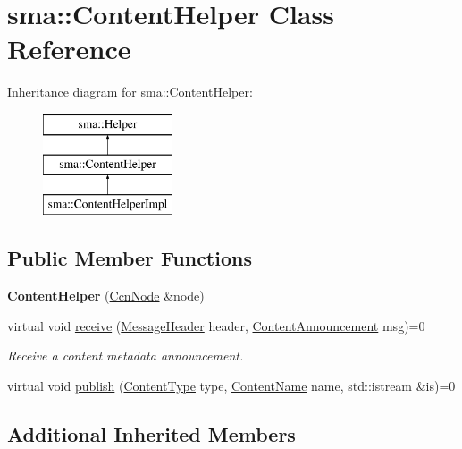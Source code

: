 \hypertarget{classsma_1_1ContentHelper}{\section{sma\-:\-:Content\-Helper Class Reference}
\label{classsma_1_1ContentHelper}
}
Inheritance diagram for sma\-:\-:Content\-Helper\-:\begin{figure}[H]
\begin{center}
\leavevmode
\includegraphics[height=3.000000cm]{classsma_1_1ContentHelper}
\end{center}
\end{figure}
\subsection*{Public Member Functions}
\begin{DoxyCompactItemize}
\item 
\hypertarget{classsma_1_1ContentHelper_a4885a081647b8d155b0b329cc41d7b27}{{\bfseries Content\-Helper} (\hyperlink{classsma_1_1CcnNode}{Ccn\-Node} \&node)}\label{classsma_1_1ContentHelper_a4885a081647b8d155b0b329cc41d7b27}

\item 
virtual void \hyperlink{classsma_1_1ContentHelper_ac19de65880beef7fa99a187945307d26}{receive} (\hyperlink{structsma_1_1MessageHeader}{Message\-Header} header, \hyperlink{structsma_1_1ContentAnnouncement}{Content\-Announcement} msg)=0
\begin{DoxyCompactList}\small\item\em Receive a content metadata announcement. \end{DoxyCompactList}\item 
virtual void \hyperlink{classsma_1_1ContentHelper_a8a17496e491d3996f93567821aef46b9}{publish} (\hyperlink{structsma_1_1ContentType}{Content\-Type} type, \hyperlink{structsma_1_1ContentName}{Content\-Name} name, std\-::istream \&is)=0
\end{DoxyCompactItemize}
\subsection*{Additional Inherited Members}


